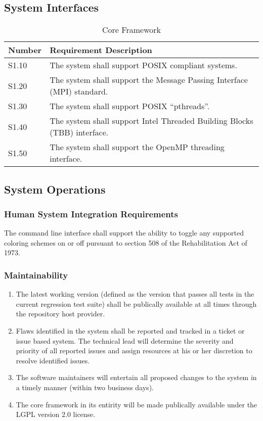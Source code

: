 \documentclass{INLreport}
\begin{document}
\clearpage

\subsection{System Interfaces}

\begin{table}[!htbp]
  \caption{Core Framework\label{tab:perf_core}}
  \setcounter{SysFirstTableCounter}{1}
  \begin{tabular}{|l|p{12cm}|}
    \rowcolor{gray}
    Number & Requirement Description \\ \hline
    S1.10 & The system shall support POSIX compliant systems. \\ \hline
    S1.20 & The system shall support the Message Passing Interface (MPI) standard. \\ \hline
    S1.30 & The system shall support POSIX ``pthreads''. \\ \hline
    S1.40 & The system shall support Intel Threaded Building Blocks (TBB) interface. \\ \hline
    S1.50 & The system shall support the OpenMP threading interface. \\ \hline
  \end{tabular}
\end{table}

\clearpage

\subsection{System Operations}

\subsubsection{Human System Integration Requirements}
The command line interface shall support the ability to toggle any supported coloring schemes on or off pursuant to section 508 of the Rehabilitation Act of 1973.

\subsubsection{Maintainability}
\label{Maintainability}
\begin{enumerate}
\item The latest working version (defined as the version that passes all tests in the current regression test suite)
      shall be publically available at all times through the repository host provider.
\item Flaws identified in the system shall be reported and tracked in a ticket or issue based system. The technical lead
      will determine the severity and priority of all reported issues and assign resources at his or her discretion to
      resolve identified issues.
\item The software maintainers will entertain all proposed changes to the system in a timely manner (within two business days).
\item The core framework in its entirity will be made publically available under the LGPL version 2.0 license.
\end{enumerate}
\end{document}
